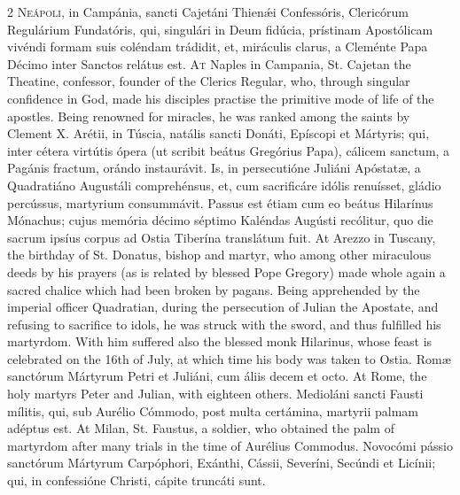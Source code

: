 \begin{paracol}{2}
\lettrine[lines=2]{N}{eápoli,} in Campánia, sancti Cajetáni Thienǽi Confessóris, Clericórum Regulárium Fundatóris, qui, 
 singulári in Deum fidúcia, prístinam Apostólicam vivéndi formam suis 
 coléndam trádidit, et, miráculis clarus, a Cleménte Papa Décimo inter 
 Sanctos relátus est.
\switchcolumn
{}
\lettrine[lines=2]{A}{t} Naples in Campania, St. Cajetan 
 the Theatine, confessor, founder of the Clerics Regular, who, through 
 singular confidence in God, made his disciples practise the primitive mode 
 of life of the apostles. Being renowned for miracles, he was ranked 
 among the saints by Clement X.
\switchcolumn*
{}
Arétii, in Túscia, 
 natális sancti Donáti, Epíscopi et Mártyris; qui, inter cétera virtútis 
 ópera (ut scribit beátus Gregórius Papa), cálicem sanctum, a Pagánis fractum, 
 orándo instaurávit. Is, in persecutióne Juliáni Apóstatæ, a 
 Quadratiáno Augustáli comprehénsus, et, cum sacrificáre idólis renuísset, 
 gládio percússus, martyrium consummávit. Passus est étiam cum eo 
 beátus Hilarínus Mónachus; cujus memória décimo séptimo Kaléndas Augústi 
 recólitur, quo die sacrum ipsíus corpus ad Ostia Tiberína translátum fuit.
\switchcolumn
{}
At Arezzo in Tuscany, the birthday 
 of St. Donatus, bishop and martyr, who among other miraculous deeds by his 
 prayers (as is related by blessed Pope Gregory) made whole again a sacred 
 chalice which had been broken by pagans. Being apprehended by the 
 imperial officer Quadratian, during the persecution of Julian the Apostate, 
 and refusing to sacrifice to idols, he was struck with the sword, and thus 
 fulfilled his martyrdom. With him suffered also the blessed monk 
 Hilarinus, whose feast is celebrated on the 16th of July, at which time his 
 body was taken to Ostia.
\switchcolumn*
{}
Romæ sanctórum Mártyrum 
 Petri et Juliáni, cum áliis decem et octo.
\switchcolumn
{}
At Rome, the holy martyrs Peter and 
 Julian, with eighteen others.
\switchcolumn*
{}
Medioláni sancti Fausti 
 mílitis, qui, sub Aurélio Cómmodo, post multa certámina, martyrii palmam 
 adéptus est.
\switchcolumn
{}
At Milan, St. Faustus, a soldier, 
 who obtained the palm of martyrdom after many trials in the time of Aurélius 
 Commodus.
\switchcolumn*
{}
Novocómi pássio 
 sanctórum Mártyrum Carpóphori, Exánthi, Cássii, Severíni, Secúndi et Licínii; 
 qui, in confessióne Christi, cápite truncáti sunt.

\end{paracol}
